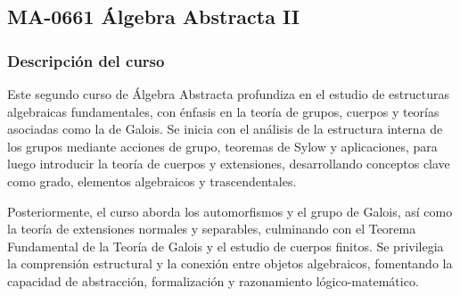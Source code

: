 \newpage
\subsection*{MA-0661 Álgebra Abstracta II}

\hypertarget{MA0661}{}
\begin{refsection}
\begin{table}[H]
\end{table}



\subsubsection*{Descripción del curso}

Este segundo curso de Álgebra Abstracta profundiza en el estudio de estructuras algebraicas fundamentales, con énfasis en la teoría de grupos, cuerpos y teorías asociadas como la de Galois. Se inicia con el análisis de la estructura interna de los grupos mediante acciones de grupo, teoremas de Sylow y aplicaciones, para luego introducir la teoría de cuerpos y extensiones, desarrollando conceptos clave como grado, elementos algebraicos y trascendentales.

Posteriormente, el curso aborda los automorfismos y el grupo de Galois, así como la teoría de extensiones normales y separables, culminando con el Teorema Fundamental de la Teoría de Galois y el estudio de cuerpos finitos. Se privilegia la comprensión estructural y la conexión entre objetos algebraicos, fomentando la capacidad de abstracción, formalización y razonamiento lógico-matemático.


\end{refsection}
